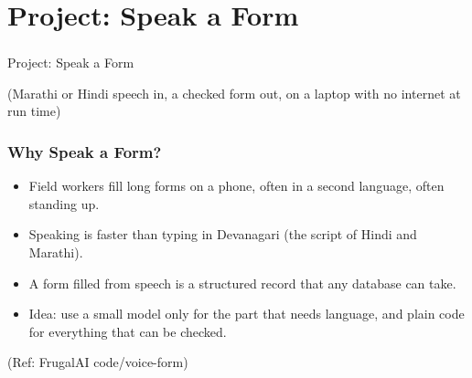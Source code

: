 
\section[Voice Form]{Project: Speak a Form}

\begin{frame}[fragile]\frametitle{}
\begin{center}
{\Large Project: Speak a Form}

\medskip
{\small (Marathi or Hindi speech in, a checked form out, on a laptop with no internet at run time)}
\end{center}
\end{frame}

\begin{frame}[fragile]\frametitle{Why Speak a Form?}
\begin{itemize}
\item Field workers fill long forms on a phone, often in a second language, often standing up.
\item Speaking is faster than typing in Devanagari (the script of Hindi and Marathi).
\item A form filled from speech is a structured record that any database can take.
\item Idea: use a small model only for the part that needs language, and plain code for everything that can be checked.
\end{itemize}
{\tiny (Ref: FrugalAI code/voice-form)}
\end{frame}


